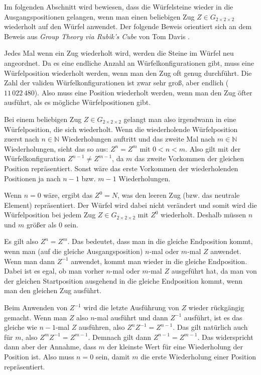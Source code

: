 \documentclass[12pt,a4paper, usenames, dvipsnames]{article}
\theoremstyle{mystyle}
\theoremstyle{definition}
\newcommand{\Gtwo}{\ensuremath{G_{2\times 2\times 2}}}
\begin{document}
Im folgenden Abschnitt wird bewiesen, dass die Würfelsteine wieder in die Ausgangspositionen gelangen, wenn man einen beliebigen Zug $Z \in \Gtwo$ wiederholt auf den Würfel anwendet.
Der folgende Beweis orientiert sich an dem Beweis aus \textit{Group Theory via Rubik's Cube} von Tom Davis \cite{TD}.

Jedes Mal wenn ein Zug wiederholt wird, werden die Steine im Würfel neu angeordnet. 
Da es eine endliche Anzahl an Würfelkonfigurationen gibt, muss eine Würfelposition wiederholt werden, wenn man den Zug oft genug durchführt.
Die Zahl der validen Würfelkonfigurationen ist zwar sehr groß, aber endlich ($11 \, 022 \, 480$). Also muss eine Position wiederholt werden, wenn man den Zug öfter ausführt, als es mögliche Würfelpositionen gibt.

Bei einem beliebigen Zug $Z \in \Gtwo$ gelangt man also irgendwann in eine Würfelposition, die sich wiederholt. Wenn die wiederholende Würfelposition zuerst nach $n \in \mathbb{N}$ Wiederholungen auftritt und das zweite Mal nach $m \in \mathbb{N}$ Wiederholungen, sieht das so aus: $Z^n=Z^m$ mit $0 < n < m$.
Also gilt mit der Würfelkonfiguration $Z^{n-1} \neq Z^{m-1}$, da $m$ das zweite Vorkommen der gleichen Position repräsentiert.
Sonst wäre das erste Vorkommen der wiederholenden Positionen ja nach $n-1$ bzw. $m-1$ Wiederholungen.

Wenn $n=0$ wäre, ergibt das $Z^0=N$, was den leeren Zug (bzw. das neutrale Element) repräsentiert. Der Würfel wird dabei nicht verändert und somit wird die Würfelposition bei jedem Zug $Z \in \Gtwo$ mit $Z^0$ wiederholt. Deshalb müssen $n$ und $m$ größer als $0$ sein.

Es gilt also $Z^n = Z^m$. Das bedeutet, dass man in die gleiche Endposition kommt, wenn man (auf die gleiche Ausgangsposition) $n$-mal oder $m$-mal $Z$ anwendet.
Wenn man dann $Z^{-1}$ anwendet, kommt man wieder in die gleiche Endposition. Dabei ist es egal, ob man vorher $n$-mal oder $m$-mal $Z$ ausgeführt hat, da man von der gleichen Startposition ausgehend in die gleiche Endposition kommt, wenn man den gleichen Zug ausführt.

Beim Anwenden von $Z^{-1}$ wird die letzte Ausführung von $Z$ wieder rückgängig gemacht. Wenn man $Z$ also $n$-mal ausführt und dann $Z^{-1}$ ausführt, ist es das gleiche wie $n-1$-mal $Z$ ausführen, also $Z^nZ^{-1}=Z^{n-1}$. Das gilt natürlich auch für $m$, also $Z^mZ^{-1}=Z^{m-1}$.
Demnach gilt dann $Z^{n-1}=Z^{m-1}$. Das widerspricht dann aber der Annahme, dass $m$ der kleinste Wert für eine Wiederholung der Position ist. Also muss $n=0$ sein, damit $m$ die erste Wiederholung einer Position repräsentiert. 
\end{document}
